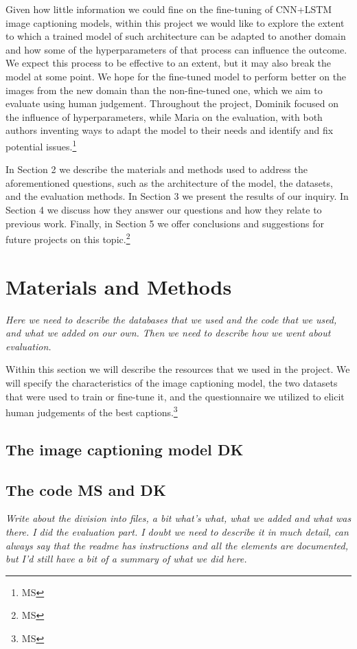 \documentclass[11pt]{article}
\begin{document}
Given how little information we could fine on the fine-tuning of CNN+LSTM image captioning models, within this project we would like to explore the extent to which a trained model of such architecture can be adapted to another domain and how some of the hyperparameters of that process can influence the outcome. We expect this process to be effective to an extent, but it may also break the model at some point. We hope for the fine-tuned model to perform better on the images from the new domain than the non-fine-tuned one, which we aim to evaluate using human judgement. Throughout the project, Dominik focused on the influence of hyperparameters, while Maria on the evaluation, with both authors inventing ways to adapt the model to their needs and identify and fix potential issues.\footnote{MS} 

In Section 2 we describe the materials and methods used to address the aforementioned questions, such as the architecture of the model, the datasets, and the evaluation methods. In Section 3 we present the results of our inquiry. In Section 4 we discuss how they answer our questions and how they relate to previous work. Finally, in Section 5 we offer conclusions and suggestions for future projects on this topic.\footnote{MS}

\section{Materials and Methods}

\textit{Here we need to describe the databases that we used and the code that we used, and what we added on our own. Then we need to describe how we went about evaluation.}

Within this section we will describe the resources that we used in the project. We will specify the characteristics of the image captioning model, the two datasets that were used to train or fine-tune it, and the questionnaire we utilized to elicit human judgements of the best captions.\footnote{MS}

\subsection{The image captioning model \textbf{DK}}
\subsection{The code \textbf{MS and DK}}

\textit{Write about the division into files, a bit what's what, what we added and what was there. I did the evaluation part. I doubt we need to describe it in much detail, can always say that the readme has instructions and all the elements are documented, but I'd still have a bit of a summary of what we did here.}
\end{document}
